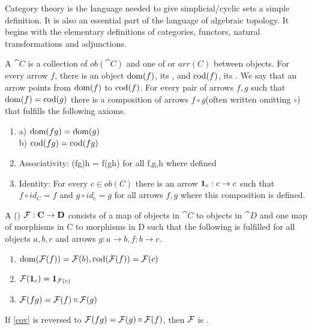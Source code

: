 \documentclass[../../main.tex]{subfiles}
\begin{document}
    Category theory is the language needed to give simplicial/cyclic sets a simple definition. It is also an essential part of the language of algebraic topology. It begins with the elementary definitions of categories, functors, natural transformations and adjunctions.
        
    \begin{definition}
        A  $\cat{C}$ is a collection of  $ob(\cat{C})$ and one of  or  $arr(C)$ between objects. For every arrow $f$, there is an object $\domain{f}$, its , and $\codomain{f}$, its . We say that an arrow points from $\domain{f}$ to $\codomain{f}$. For every pair of arrows $f, g$ such that $\domain{f} = \codomain{g}$ there is a composition of arrows $f \circ g$(often written omitting $\circ$) that fulfills the following axioms.
        
        \begin{enumerate}
            \item a) $\domain{fg} = \domain{g}$ \\
                b) $\codomain{fg} = \codomain{fg}$
            \item Associativity: (fg)h = f(gh) for all f,g,h where defined
            \item Identity: For every $c \in ob(C)$ there is an arrow $\idarrow[c]: c \to c$ such that $f \circ id_C = f$ and $g \circ id_c = g$ for all arrows $f, g$ where this composition is defined.
        \end{enumerate}
    \end{definition}
    
    \begin{definition}
        A ()  $\functor{F}: \cat{C} \to \cat{D}$ consists of a map of objects in $\cat{C}$ to objects in $\cat{D}$ and one map of morphisms in C to morphisms in D such that the following is fulfilled for all objects $a, b, c$ and arrows $g: a \to b, f: b \to c$.
        
        \begin{enumerate}
            \item $\domain{\functor{F}(f)} = \functor{F}(b), \codomain{\functor{F}(f)} = \functor{F}(c)$
            \item $\functor{F}(\idarrow[c]) = \idarrow[\functor{F}(c)]$
            \item $\functor{F}(fg) = \functor{F}(f) \circ \functor{F}(g)$ \label{cov}
        \end{enumerate}
        
        If \ref{cov} is reversed to $\functor{F}(fg) = \functor{F}(g) \circ \functor{F}(f)$, then $\functor{F}$ is .
    \end{definition}
    
\end{document}
